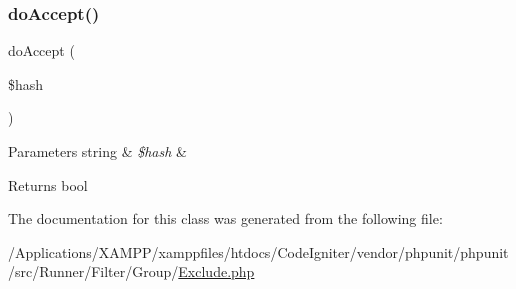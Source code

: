 \subsubsection{\texorpdfstring{do\+Accept()}{doAccept()}}
{\footnotesize\ttfamily do\+Accept (\begin{DoxyParamCaption}\item[{}]{\$hash }\end{DoxyParamCaption})\hspace{0.3cm}{\ttfamily [protected]}}


\begin{DoxyParams}[1]{Parameters}
string & {\em \$hash} & \\
\hline
\end{DoxyParams}
\begin{DoxyReturn}{Returns}
bool 
\end{DoxyReturn}


The documentation for this class was generated from the following file\+:\begin{DoxyCompactItemize}
\item 
/\+Applications/\+X\+A\+M\+P\+P/xamppfiles/htdocs/\+Code\+Igniter/vendor/phpunit/phpunit/src/\+Runner/\+Filter/\+Group/\mbox{\hyperlink{_exclude_8php}{Exclude.\+php}}\end{DoxyCompactItemize}
